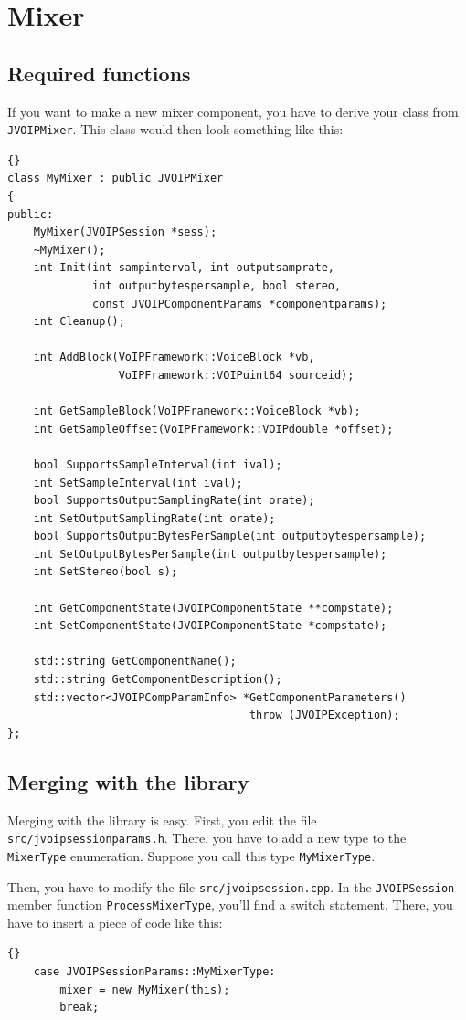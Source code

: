 	\section{Mixer}

		\subsection{Required functions}

		If you want to make a new mixer component, you have to derive your class from
		{\tt JVOIPMixer}. This class would then look something like this:
		\begin{lstlisting}[frame=tb]{}
class MyMixer : public JVOIPMixer
{
public:
	MyMixer(JVOIPSession *sess);
	~MyMixer();
	int Init(int sampinterval, int outputsamprate, 
	         int outputbytespersample, bool stereo,
	         const JVOIPComponentParams *componentparams);
	int Cleanup();

	int AddBlock(VoIPFramework::VoiceBlock *vb,
	             VoIPFramework::VOIPuint64 sourceid);
	
	int GetSampleBlock(VoIPFramework::VoiceBlock *vb);
	int GetSampleOffset(VoIPFramework::VOIPdouble *offset);
	
	bool SupportsSampleInterval(int ival);
	int SetSampleInterval(int ival);
	bool SupportsOutputSamplingRate(int orate);
	int SetOutputSamplingRate(int orate);
	bool SupportsOutputBytesPerSample(int outputbytespersample);
	int SetOutputBytesPerSample(int outputbytespersample);
	int SetStereo(bool s);

	int GetComponentState(JVOIPComponentState **compstate);
	int SetComponentState(JVOIPComponentState *compstate);
	
	std::string GetComponentName();
	std::string GetComponentDescription();
	std::vector<JVOIPCompParamInfo> *GetComponentParameters() 
	                                 throw (JVOIPException);
};
		\end{lstlisting}

		\subsection{Merging with the library}

		Merging with the library is easy. First, you edit the file 
		{\tt src/jvoipsessionparams.h}. There, you have to add a new type to the
		{\tt MixerType} enumeration. Suppose you call this type {\tt MyMixerType}.

		Then, you have to modify the file {\tt src/jvoipsession.cpp}. In the
		{\tt JVOIPSession} member function {\tt ProcessMixerType}, you'll find
		a switch statement. There, you have to insert a piece of code like this:
		\begin{lstlisting}[frame=tb]{}
	case JVOIPSessionParams::MyMixerType:
		mixer = new MyMixer(this);
		break;
		\end{lstlisting}

